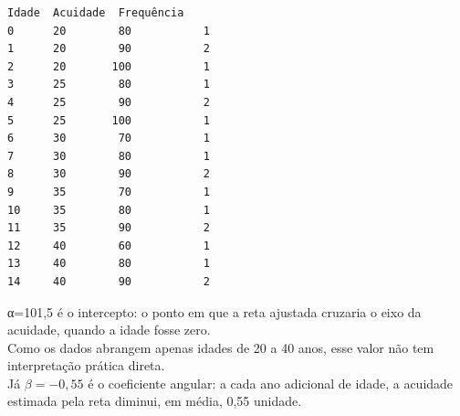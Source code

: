 \documentclass[11pt]{article}
\makeatletter
\newcommand{\boxspacing}{\kern\kvtcb@left@rule\kern\kvtcb@boxsep}
\newcommand{\prompt}[4]{
        {\ttfamily\llap{{\color{#2}[#3]:\hspace{3pt}#4}}\vspace{-\baselineskip}}
    }
\makeatother
\begin{document}
            \begin{tcolorbox}[breakable, size=fbox, boxrule=.5pt, pad at break*=1mm, opacityfill=0]
\prompt{Out}{outcolor}{68}{\boxspacing}
\begin{Verbatim}[commandchars=\\\{\}]
    Idade  Acuidade  Frequência
0      20        80           1
1      20        90           2
2      20       100           1
3      25        80           1
4      25        90           2
5      25       100           1
6      30        70           1
7      30        80           1
8      30        90           2
9      35        70           1
10     35        80           1
11     35        90           2
12     40        60           1
13     40        80           1
14     40        90           2
\end{Verbatim}
\end{tcolorbox}
        
    α=101,5 é o intercepto: o ponto em que a reta ajustada cruzaria o eixo
da acuidade, quando a idade fosse zero.\\
Como os dados abrangem apenas idades de 20 a 40 anos, esse valor não tem
interpretação prática direta.\\
Já \(\beta=-0{,}55\) é o coeficiente angular: a cada ano adicional de
idade, a acuidade estimada pela reta diminui, em média, 0,55 unidade.
\end{document}
